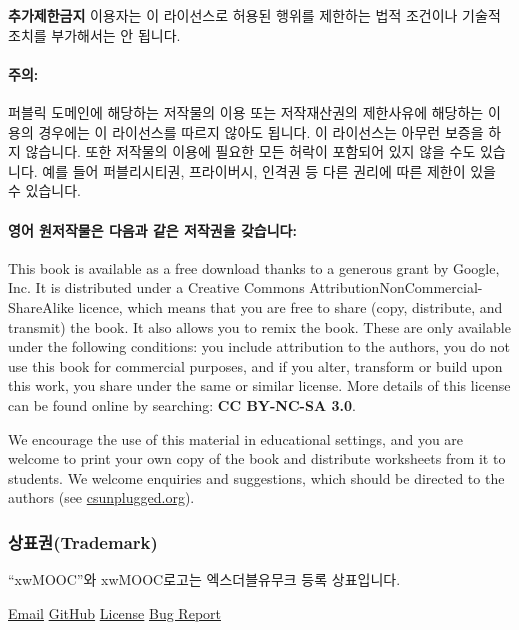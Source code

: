 \documentclass[]{article}
\begin{document}
\textbf{추가제한금지} 이용자는 이 라이선스로 허용된 행위를 제한하는 법적
조건이나 기술적 조치를 부가해서는 안 됩니다.

\mbox{}\paragraph{주의:}\label{section-283}

퍼블릭 도메인에 해당하는 저작물의 이용 또는 저작재산권의 제한사유에
해당하는 이용의 경우에는 이 라이선스를 따르지 않아도 됩니다. 이
라이선스는 아무런 보증을 하지 않습니다. 또한 저작물의 이용에 필요한 모든
허락이 포함되어 있지 않을 수도 있습니다. 예를 들어 퍼블리시티권,
프라이버시, 인격권 등 다른 권리에 따른 제한이 있을 수 있습니다.

\mbox{}\paragraph{영어 원저작물은 다음과 같은 저작권을
갖습니다:}\label{section-284}

This book is available as a free download thanks to a generous grant by
Google, Inc. It is distributed under a Creative Commons
AttributionNonCommercial-ShareAlike licence, which means that you are
free to share (copy, distribute, and transmit) the book. It also allows
you to remix the book. These are only available under the following
conditions: you include attribution to the authors, you do not use this
book for commercial purposes, and if you alter, transform or build upon
this work, you share under the same or similar license. More details of
this license can be found online by searching: \textbf{CC BY-NC-SA 3.0}.

We encourage the use of this material in educational settings, and you
are welcome to print your own copy of the book and distribute worksheets
from it to students. We welcome enquiries and suggestions, which should
be directed to the authors (see
\href{http://csunplugged.org}{csunplugged.org}).

\subsubsection{상표권(Trademark)}\label{trademark}

``xwMOOC''와 xwMOOC로고는 엑스더블유무크 등록 상표입니다.

\href{mailto:i@xwmooc.net}{Email}
\href{https://github.com/statkclee/xwmooc-sc}{GitHub}
\href{./LICENSE.html}{License}
\href{mailto:i@xwmooc.net?subject=bug\%20in\%20book.md}{Bug Report}
\end{document}
